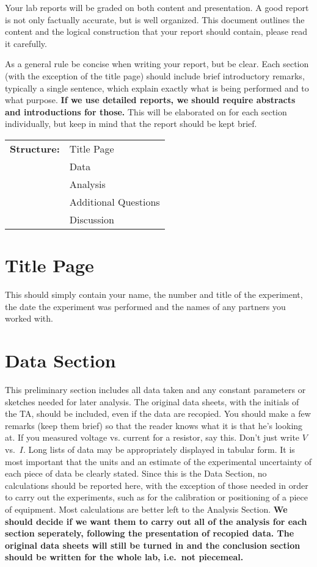 Your lab reports will be graded on both content and presentation. A good 
report is not only factually accurate, but is well organized. This document 
outlines the content and the logical construction that your report should 
contain, please read it carefully.

As a general rule be concise when writing your report, but be clear. Each 
section (with the exception of the title page) should include brief 
introductory remarks,  typically a single sentence, which explain exactly what 
is being performed and to what purpose. {\bf If we use detailed reports, we 
should require abstracts and introductions for those.} This will be elaborated 
on for each section individually, but keep in mind that the report should be 
kept brief. \\
\begin{center}
\begin{tabular}{ll}
{\large \bf Structure:} & Title Page\\
& Data\\
& Analysis\\
& Additional Questions\\
& Discussion
\end{tabular}
\end{center}

\section{Title Page}

This should simply contain your name, the number and title of the experiment,
the date the experiment was performed and the names of any partners
you worked with.  

\section{Data Section} 

This preliminary section includes all data taken and any constant
parameters or sketches needed for later analysis. The original data sheets,  
with the initials of the TA, should be included, even if the data are recopied.
You should make a few remarks (keep them brief) so that the reader knows what 
it is that he's looking at. If you measured voltage vs. current for a resistor,
say this. Don't just write $V$ vs.\ $I$. Long lists of data may be 
appropriately displayed in tabular form.  It is most important that the units 
and an estimate of the experimental uncertainty of each piece of data be 
clearly stated. Since this is the Data Section, no calculations should be 
reported here, with the exception of those needed in order to carry out the 
experiments, such as for the calibration or positioning of a piece of 
equipment. Most calculations are better left to the Analysis Section. 
{\bf We should decide if we want them to carry out all of the analysis for 
each section seperately, following the presentation of recopied data.  The 
original data sheets will still be turned in and the conclusion section should 
be written for the whole lab, i.e.\ not piecemeal.}


